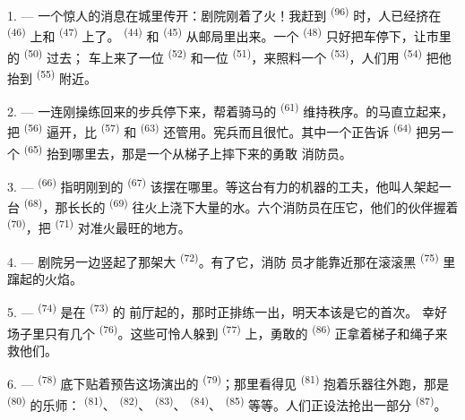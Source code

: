 \VUsaut{3.4mm}

1. --- 一个惊人的消息在城里传开：剧院刚着了火！我赶到
\textsuperscript{(96)} 时，人已经挤在 \textsuperscript{(46)} 上和
 \textsuperscript{(47)} 上了。 \textsuperscript{(44)} 和
 \textsuperscript{(45)} 从邮局里出来。一个
\textsuperscript{(48)} 只好把车停下，让市里的 \textsuperscript{(50)} 过去；
车上来了一位 \textsuperscript{(52)} 和一位
\textsuperscript{(51)}，来照料一个 \textsuperscript{(53)}，人们用
 \textsuperscript{(54)} 把他抬到 \textsuperscript{(55)} 附近。

2. --- 一连刚操练回来的步兵停下来，帮着骑马的 \textsuperscript{(61)}
维持秩序。的马直立起来，把
\textsuperscript{(56)} 逼开，比 \textsuperscript{(57)} 和
\textsuperscript{(63)} 还管用。宪兵而且很忙。其中一个正告诉 \textsuperscript{(64)} 把另一个
 \textsuperscript{(65)} 抬到哪里去，那是一个从梯子上摔下来的勇敢
消防员。

3. ---  \textsuperscript{(66)} 指明刚到的
\textsuperscript{(67)} 该摆在哪里。等这台有力的机器的工夫，他叫人架起一台
 \textsuperscript{(68)}，那长长的 \textsuperscript{(69)}
往火上浇下大量的水。六个消防员在压它，他们的伙伴握着
\textsuperscript{(70)}，把 \textsuperscript{(71)} 对准火最旺的地方。

4. --- 剧院另一边竖起了那架大 \textsuperscript{(72)}。有了它，消防
员才能靠近那在滚滚黑 \textsuperscript{(75)} 里蹿起的火焰。

\VUsaut{5.0mm}
\VUsaut{3.4mm}

5. ---  \textsuperscript{(74)} 是在 \textsuperscript{(73)} 的
前厅起的，那时正排练一出，明天本该是它的首次。
幸好场子里只有几个 \textsuperscript{(76)}。这些可怜人躲到
 \textsuperscript{(77)} 上，勇敢的 \textsuperscript{(86)}
正拿着梯子和绳子来救他们。

6. ---  \textsuperscript{(78)} 底下贴着预告这场演出的
\textsuperscript{(79)}；那里看得见 \textsuperscript{(81)}
抱着乐器往外跑，那是 \textsuperscript{(80)} 的乐师：
\textsuperscript{(81)}、 \textsuperscript{(82)}、
\textsuperscript{(83)}、 \textsuperscript{(84)}、 \textsuperscript{(85)}
等等。人们正设法抢出一部分 \textsuperscript{(87)}。

